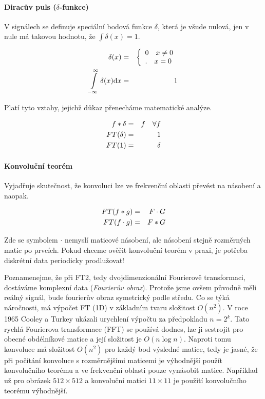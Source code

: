 \paragraph{Diracův puls ($\delta$-funkce)} 

V signálech se definuje speciální bodová funkce $\delta$, která je všude nulová, jen v nule má takovou hodnotu, že
$\int \delta(x)=1$.

\begin{eqnarray}
\delta(x)&=&\left\{\begin{array}{ll}0\quad x\neq0\\.\quad x=0\end{array}\right.\\
\int\limits_{-\infty}^\infty\delta(x){\rm d} x&=&1
\end{eqnarray}

Platí tyto vztahy, jejichž důkaz přenecháme matematické analýze.

\begin{eqnarray}
f\ast\delta&=&f\quad\forall f\\
FT(\delta)&=&1\\
FT(1)&=&\delta
\end{eqnarray}

\paragraph{Konvoluční teorém}  Vyjadřuje skutečnost, že konvoluci lze ve frekvenční oblasti převést na násobení a naopak.

\begin{eqnarray}
FT(f\ast g)&=&F\cdot G\\
FT(f\cdot g)&=&F\ast G
\end{eqnarray}

Zde se symbolem $\cdot$ nemyslí maticové násobení, ale násobení stejně rozměrných matic po prvcích.
Pokud chceme ověřit konvoluční teorém v praxi, je potřeba diskrétní data periodicky prodlužovat!

Poznamenejme, že při FT2, tedy dvojdimenzionální Fourierově transformaci, dostáváme komplexní data ({\em Fourierův obraz}).
Protože jsme ovšem původně měli reálný signál, bude fourierův obraz symetrický podle středu. Co se týká náročnosti,
má výpočet FT (1D) v základním tvaru složitost $O(n^2)$. V roce 1965 Cooley a Turkey ukázali urychlení výpočtu za předpokladu
$n=2^k$. Tato rychlá Fourierova transformace (FFT) se používá dodnes, lze ji sestrojit pro obecné obdélníkové matice
a její složitost je $O(n\log n)$. Naproti tomu konvoluce má složitost $O(n^2)$ pro každý bod výsledné matice, 
tedy je jasné, že při počítání konvoluce s rozměrnějšími maticemi je výhodnější použít konvolučního teorému a ve frekvenční
oblasti pouze vynásobit matice. Například už pro obrázek $512\times512$ a konvoluční matici  $11\times11$ je použití
konvolučního teorému výhodnější.

